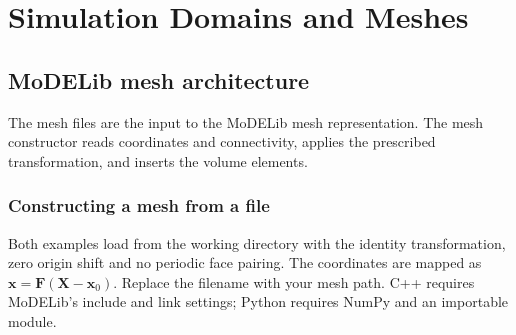 \chapter{Simulation Domains and Meshes}\label{chap:mesh}


\clearpage
\section{MoDELib mesh architecture}\label{sec:meshArchitecture}
The  mesh files are the input to the MoDELib mesh representation. The mesh constructor reads coordinates and connectivity, applies the prescribed transformation, and inserts the volume elements.

\subsection{Constructing a mesh from a file}
Both examples load  from the working directory with the identity transformation, zero origin shift and no periodic face pairing. The coordinates are mapped as $\bm x=\bm F(\bm X-\bm x_0)$. Replace the filename with your mesh path. C++ requires MoDELib's include and link settings; Python requires NumPy and an importable  module.

